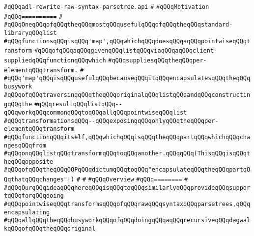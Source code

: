 \label{src/lib/compiler/back/low/tools/adl-syntax/adl-rewrite-raw-syntax-parsetree.api}
\verb|#qQQqadl-rewrite-raw-syntax-parsetree.api|\newline
\verb|#|\newline
\verb|#qQQqMotivation|\newline
\verb|#qQQq==========|\newline
\verb|#|\newline
\verb|#qQQqOneqQQqofqQQqtheqQQqmostqQQqusefulqQQqofqQQqtheqQQqstandard-libraryqQQqlist|\newline
\verb|#qQQqfunctionsqQQqisqQQq'map',qQQqwhichqQQqdoesqQQqaqQQqpointwiseqQQqtransform|\newline
\verb|#qQQqofqQQqaqQQqgivenqQQqlistqQQqviaqQQqaqQQqclient-suppliedqQQqfunctionqQQqwhich|\newline
\verb|#qQQqsuppliesqQQqtheqQQqper-elementqQQqtransform.|\newline
\verb|#|\newline
\verb|#qQQq'map'qQQqisqQQqusefulqQQqbecauseqQQqitqQQqencapsulatesqQQqtheqQQqbusywork|\newline
\verb|#qQQqofqQQqtraversingqQQqtheqQQqoriginalqQQqlistqQQqandqQQqconstructingqQQqthe|\newline
\verb|#qQQqresultqQQqlistqQQq--qQQqworkqQQqcommonqQQqtoqQQqallqQQqpointwiseqQQqlist|\newline
\verb|#qQQqtransformationsqQQq--qQQqexposingqQQqonlyqQQqtheqQQqper-elementqQQqtransform|\newline
\verb|#qQQqfunctionqQQqitself,qQQqwhichqQQqisqQQqtheqQQqpartqQQqwhichqQQqchangesqQQqfrom|\newline
\verb|#qQQqonqQQqlistqQQqtransformqQQqtoqQQqanother.qQQqqQQq(ThisqQQqisqQQqtheqQQqopposite|\newline
\verb|#qQQqofqQQqtheqQQqOOPqQQqdictumqQQqtoqQQq"encapsulateqQQqtheqQQqpartqQQqthatqQQqchanges"!)|\newline
\verb|#|\newline
\verb|#|\newline
\verb|#qQQqOverview|\newline
\verb|#qQQq========|\newline
\verb|#|\newline
\verb|#qQQqOurqQQqideaqQQqhereqQQqisqQQqtoqQQqsimilarlyqQQqprovideqQQqsupportqQQqforqQQqdoing|\newline
\verb|#qQQqpointwiseqQQqtransformsqQQqofqQQqrawqQQqsyntaxqQQqparsetrees,qQQqencapsulating|\newline
\verb|#qQQqallqQQqtheqQQqbusyworkqQQqofqQQqdoingqQQqaqQQqrecursiveqQQqdagwalkqQQqofqQQqtheqQQqoriginal|\newline
